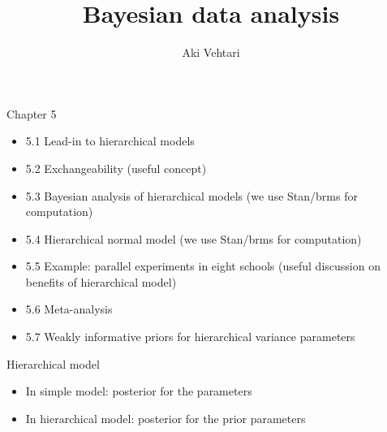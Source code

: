 \documentclass[finnish,english,t]{beamer}
\title[]{Bayesian data analysis}
\subtitle{}
\author{Aki Vehtari}
\institute[Aalto]{}
\begin{document}
\begin{frame}{Chapter 5}

  \begin{itemize}
\item 5.1 Lead-in to hierarchical models
\item 5.2 Exchangeability (useful concept)
\item {\color{gray}5.3 Bayesian analysis of hierarchical models (we use Stan/brms for computation)}
\item {\color{gray}5.4 Hierarchical normal model (we use Stan/brms for computation)}
\item 5.5 Example: parallel experiments in eight schools (useful discussion on benefits of hierarchical model)
\item 5.6 Meta-analysis
\item 5.7 Weakly informative priors for hierarchical variance parameters
\end{itemize}
\end{frame}



\begin{frame}{Hierarchical model}

  \begin{itemize}
  \item In simple model: posterior for the parameters
  \item In hierarchical model: posterior for the prior parameters
  \end{itemize}

\end{frame}
\end{document}
